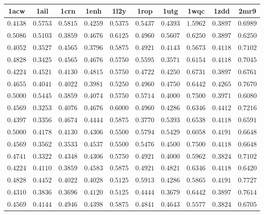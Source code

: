 \centering
\begin{longtable}{c|c|c|c|c|c|c|c|c|c}
1acw & 1ail & 1crn & 1enh & 1l2y & 1rop & 1utg & 1wqc & 1zdd & 2mr9 \\ \hline \hline
$0.4138$ & $0.5753$ & $0.5815$ & $0.4259$ & $0.5375$ & $0.5437$ & $0.4393$ & $1.5962$ & $0.3897$ & $0.6989$ \\ \hline
$0.5086$ & $0.5103$ & $0.3859$ & $0.4676$ & $0.6125$ & $0.4960$ & $0.5607$ & $0.6250$ & $0.3897$ & $0.6250$ \\ \hline
$0.4052$ & $0.3527$ & $0.4565$ & $0.3796$ & $0.5875$ & $0.4921$ & $0.4143$ & $0.5673$ & $0.4118$ & $0.7102$ \\ \hline
$0.4828$ & $0.3425$ & $0.4565$ & $0.4676$ & $0.5750$ & $0.5595$ & $0.3571$ & $0.6154$ & $0.4118$ & $0.7045$ \\ \hline
$0.4224$ & $0.4521$ & $0.4130$ & $0.4815$ & $0.5750$ & $0.4722$ & $0.4250$ & $0.6731$ & $0.3897$ & $0.6761$ \\ \hline
$0.4655$ & $0.4041$ & $0.4022$ & $0.3981$ & $0.5250$ & $0.4960$ & $0.4750$ & $0.6442$ & $0.4265$ & $0.7670$ \\ \hline
$0.5000$ & $0.5445$ & $0.3859$ & $0.4074$ & $0.5750$ & $0.5714$ & $0.4000$ & $0.7500$ & $0.3971$ & $0.6080$ \\ \hline
$0.4569$ & $0.3253$ & $0.4076$ & $0.4676$ & $0.6000$ & $0.4960$ & $0.4286$ & $0.6346$ & $0.4412$ & $0.7216$ \\ \hline
$0.4397$ & $0.3356$ & $0.4674$ & $0.4444$ & $0.5875$ & $0.3770$ & $0.5393$ & $0.6538$ & $0.4118$ & $0.6591$ \\ \hline
$0.5000$ & $0.4178$ & $0.4130$ & $0.4306$ & $0.5500$ & $0.5794$ & $0.5429$ & $0.6058$ & $0.4191$ & $0.6648$ \\ \hline
$0.4569$ & $0.3562$ & $0.3533$ & $0.4537$ & $0.5500$ & $0.5476$ & $0.4500$ & $0.7500$ & $0.4118$ & $0.6648$ \\ \hline
$0.4741$ & $0.3322$ & $0.4348$ & $0.4306$ & $0.5750$ & $0.4921$ & $0.4000$ & $0.5962$ & $0.3824$ & $0.7102$ \\ \hline
$0.4224$ & $0.4110$ & $0.3859$ & $0.4583$ & $0.5875$ & $0.4921$ & $0.4821$ & $0.6346$ & $0.4118$ & $0.6420$ \\ \hline
$0.4828$ & $0.4452$ & $0.4022$ & $0.4028$ & $0.5125$ & $0.5913$ & $0.4286$ & $0.5865$ & $0.4191$ & $0.7727$ \\ \hline
$0.4310$ & $0.3836$ & $0.3696$ & $0.4120$ & $0.5125$ & $0.4444$ & $0.3679$ & $0.6442$ & $0.3897$ & $0.7614$ \\ \hline
$0.4569$ & $0.4144$ & $0.4946$ & $0.4398$ & $0.5875$ & $0.4841$ & $0.4643$ & $0.5577$ & $0.3824$ & $0.6705$ \\ \hline

\end{longtable}
